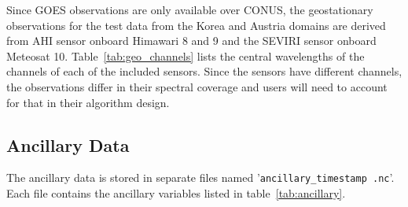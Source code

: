 \documentclass[11pt]{article}
\begin{document}
Since GOES observations are only available over CONUS, the geostationary
observations for the test data from the Korea and Austria domains are derived
from AHI sensor onboard Himawari 8 and 9 and the SEVIRI sensor onboard Meteosat
10. Table~\ref{tab:geo_channels} lists the central wavelengths of the
channels of each of the included sensors. Since the sensors have different
channels, the observations differ in their spectral coverage and users will need
to account for that in their algorithm design.

\subsection{Ancillary Data}

The ancillary data is stored in separate files named
'\texttt{ancillary\_\textlangle timestamp \textrangle.nc}'. Each file contains
  the ancillary variables listed in table~\ref{tab:ancillary}.
\end{document}
